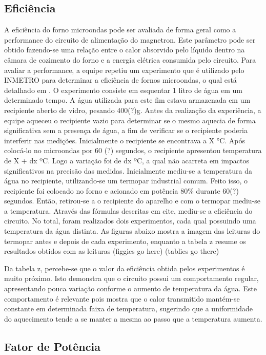 \subsection{Eficiência}
A eficiência do forno microondas pode ser avaliada de forma geral como a performance do circuito de alimentação do magnetron. Este parâmetro pode ser obtido fazendo-se uma relação entre o calor absorvido pelo líquido dentro na câmara de cozimento do forno e a energia elétrica consumida pelo circuito.
Para avaliar a performance, a equipe repetiu um experimento que é utilizado pelo INMETRO para determinar a eficiência de fornos microondas, o qual está detalhado em \cite{Inmetro}. O experimento consiste em esquentar 1 litro de água em um determinado tempo. A água utilizada para este fim estava armazenada em um recipiente aberto de vidro, pesando 400(?)g. Antes da realização da experiência, a equipe aqueceu o recipiente vazio para determinar se o mesmo aquecia de forma significativa sem a presença de água, a fim de verificar se o recipiente poderia interferir nas medições. Inicialmente o recipiente se encontrava a X °C. Após colocá-lo no microondas por 60 (?) segundos, o recipiente apresentou temperatura de X + dx ºC. Logo a variação foi de dx ºC, a qual não acarreta em impactos significativos na precisão das medidas.
Inicialmente mediu-se a temperatura da água no recipiente, utilizando-se um termopar industrial comum. Feito isso, o recipiente foi colocado no forno e acionado em potência 80\% durante 60(?) segundos. Então, retirou-se a o recipiente do aparelho e com o termopar mediu-se a temperatura. Através das fórmulas descritas em cite, mediu-se a eficiência do circuito. No total, foram realizados dois experimentos, cada qual possuindo uma temperatura da água distinta. As figuras abaixo mostra a imagem das leituras do termopar antes e depois de cada experimento, enquanto a tabela z resume os resultados obtidos com as leituras
(figgies go here)
(tablies go there)


Da tabela z, percebe-se que o valor da eficiência obtida pelos experimentos é muito próximo. Isto demonstra que o circuito possui um comportamento regular, apresentando pouca variação conforme o aumento de temperatura da água. Este comportamento é relevante pois mostra que o calor transmitido mantém-se constante em determinada faixa de temperatura, sugerindo que a uniformidade do aquecimento tende a se manter a mesma ao passo que a temperatura aumenta.

\subsection{Fator de Potência}

